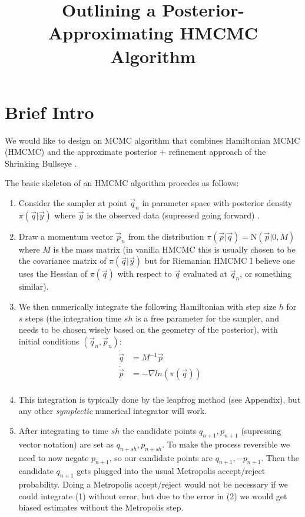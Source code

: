 \documentclass[12pt,a4paper]{article}
\title{Outlining a Posterior-Approximating HMCMC Algorithm}
\begin{document}
\maketitle
\section{Brief Intro}
We would like to design an MCMC algorithm that combines Hamiltonian MCMC (HMCMC) \parencite{neal_mcmc_2012,betancourt_geometric_2014,betancourt_conceptual_2017} and the approximate posterior + refinement approach of the Shrinking Bullseye \parencite{conrad_accelerating_2015}. 

The basic skeleton of an HMCMC algorithm procedes as follows:
\begin{enumerate}
\item Consider the sampler at point $\vec{q}_n$ in parameter space with posterior density $\pi(\vec{q} | \vec{y})$ where $\vec{y}$ is the observed data (supressed going forward) .
\item Draw a momentum vector $\vec{p}_n$ from the distribution $\pi(\vec{p} | \vec{q} ) = \text{N}(\vec{p} |0, M)$ where $M$ is the mass matrix (in vanilla HMCMC this is usually chosen to be the covariance matrix of $\pi(\vec{q}|\vec{y})$ but for Riemanian HMCMC I believe one uses the Hessian of $\pi(\vec{q})$ with respect to $\vec{q}$ evaluated at $\vec{q}_n$, or something similar).
\item We then numerically integrate the following Hamiltonian with step size $h$ for $s$ steps (the integration time $sh$ is a free parameter for the sampler, and needs to be chosen wisely based on the geometry of the posterior), with initial conditions $(\vec{q}_n, \vec{p}_n)$:
\begin{equation}
\begin{split}
\dot{\vec{q}} &= M^{-1} \vec{p} \\ 
\dot{\vec{p}} &= - \nabla ln(\pi(\vec{q}))\\
\end{split}
\end{equation}
\item This integration is typically done by the leapfrog method (see Appendix), but any other \textit{symplectic} numerical integrator will work.
\item After integrating to time $sh$ the candidate points $q_{n+1}, p_{n+1}$ (supressing vector notation) are set as $q_{n+sh}, p_{n+sh}$.  To make the process reversible we need to now negate $p_{n+1}$, so our candidate points are $q_{n+1}, -p_{n+1}$.  Then the candidate $q_{n+1}$ gets plugged into the usual Metropolis accept/reject probability.  Doing a Metropolis accept/reject would not be necessary if we could integrate (1) without error, but due to the error in (2) we would get biased estimates without the Metropolis step.
\end{enumerate}
\end{document}

